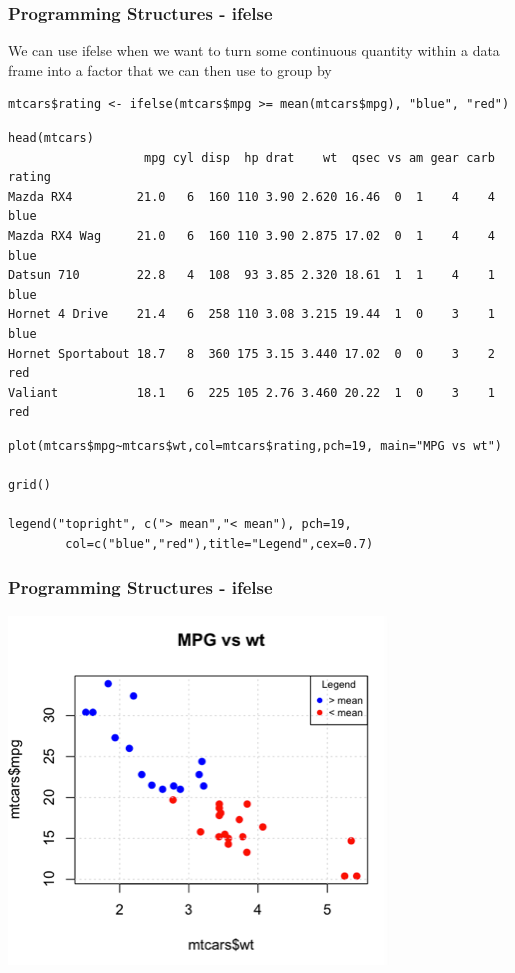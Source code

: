 \documentclass{beamer}
\begin{document}
%

\begin{frame}[fragile]
\frametitle{Programming Structures - ifelse}
We can use ifelse when we want to turn some continuous quantity within a data frame into a factor that we can then use to group by
\footnotesize
\begin{verbatim}
mtcars$rating <- ifelse(mtcars$mpg >= mean(mtcars$mpg), "blue", "red")
\end{verbatim}
\scriptsize
\begin{verbatim}
head(mtcars)
                   mpg cyl disp  hp drat    wt  qsec vs am gear carb rating
Mazda RX4         21.0   6  160 110 3.90 2.620 16.46  0  1    4    4   blue
Mazda RX4 Wag     21.0   6  160 110 3.90 2.875 17.02  0  1    4    4   blue
Datsun 710        22.8   4  108  93 3.85 2.320 18.61  1  1    4    1   blue
Hornet 4 Drive    21.4   6  258 110 3.08 3.215 19.44  1  0    3    1   blue
Hornet Sportabout 18.7   8  360 175 3.15 3.440 17.02  0  0    3    2    red
Valiant           18.1   6  225 105 2.76 3.460 20.22  1  0    3    1    red
\end{verbatim}
\footnotesize
\begin{verbatim}
plot(mtcars$mpg~mtcars$wt,col=mtcars$rating,pch=19, main="MPG vs wt")

grid()

legend("topright", c("> mean","< mean"), pch=19,
        col=c("blue","red"),title="Legend",cex=0.7)
\end{verbatim}
\end{frame}
%

\begin{frame}[fragile]
\frametitle{Programming Structures - ifelse}
\begin{center}
\includegraphics{../IMG/ifelse.png}
\end{center}
\end{frame}
\end{document}
